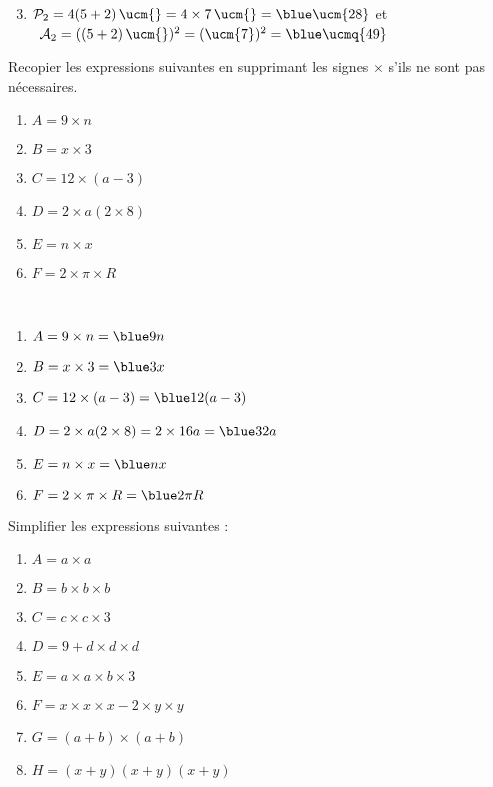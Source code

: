\begin{colonne*exercice}
\begin{corrige}
   \begin{enumerate}
   \setcounter{enumi}{2}
      \item $\mathcal{P}_2 =4(5+2) \, \ucm{} = 4\times7 \, \ucm{} =\blue\ucm{28}$ et \\
      \quad\, $\mathcal{A}_2 =((5+2)\,\ucm{})^2 =(\ucm{7})^2 =\blue\ucmq{49}$
   \end{enumerate}
\end{corrige}

\bigskip


\begin{exercice} %
Recopier les expressions suivantes en supprimant les signes $\times$ s'ils ne sont pas nécessaires.
\begin{enumerate}
   \item $A =9\times n$
   \item $B =x\times3$
   \item $C =12\times(a-3)$
   \item $D =2\times a(2\times8)$
   \item $E =n\times x$
   \item $F =2\times\pi\times R$
\end{enumerate}
\end{exercice}

\begin{corrige}
   \ \\ [-5mm]
   \begin{enumerate}
      \item $A =9\times n =\blue9n$
      \item $B =x\times3 =\blue3x$
      \item $C =12\times(a-3) =\blue12(a-3)$
      \item $D =2\times a(2\times8) =2\times16a =\blue32a$
      \item $E =n\times x =\blue nx$
      \item $F =2\times\pi\times R =\blue2\pi R$
\end{enumerate}
\end{corrige}

\bigskip

\begin{exercice} %
   Simplifier les expressions suivantes :
   \begin{enumerate}
      \item $A =a\times a$
      \item $B =b\times b\times b$
      \item $C =c\times c\times3$
      \item $D =9+d\times d\times d$
      \item $E =a\times a\times b\times3$
      \item $F =x\times x\times x-2\times y\times y$
      \item $G =(a+b)\times(a+b)$
      \item $H =(x+y)(x+y)(x+y)$
   \end{enumerate}
\end{exercice}


\end{colonne*exercice}
